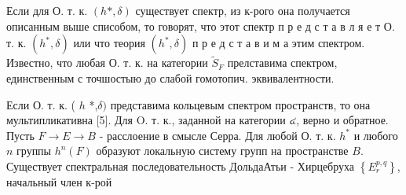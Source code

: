 \documentclass[10pt]{article}
\begin{document}
Если для О. т. к. $(h *, \delta)$ существует спектр, из к-рого она получается описанным выше списобом, то говорят, что этот спектр п р е д с т а в л я е т О. т. к. $\left(h^{*}, \delta\right)$ или что теория $\left(h^{*}, \delta\right)$ п р е д с т а в и м а этим спектром. Известно, что любая О. т. к. на категории $\widetilde{S}_{F}$ прелставима спектром, единственным с точшостыю до слабой гомотопич. эквивалентности.



Если О. т. к. ( $h$ *,$\delta)$ представима кольцевым спектром пространств, то она мультипликативна [5]. Для O. т. к., заданной на категории ๔, верно и обратное. Пусть $F \rightarrow E \rightarrow B$ - расслоение в смысле Серра. Для любой О. т. к. $h^{*}$ и любого $n$ группы $h^{n}(F)$ образуют локальную систему групп на пространстве $B$. Существует спектральная последовательность ДольдаАтьи - Хирцебруха $\left\{E_{r}^{p, q}\right\}$, начальный член к-рой
\end{document}
